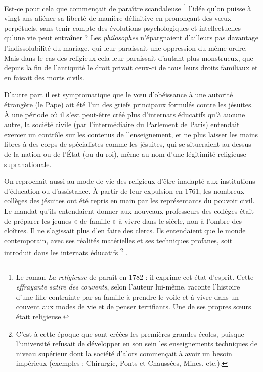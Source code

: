  Est-ce pour cela que commençait de paraître scandaleuse%
\footnote{Le roman \emph{La religieuse} de  paraît en 1782 : il exprime cet état d'esprit. Cette \emph{effrayante satire des couvents}, selon l'auteur lui-même, raconte l'histoire d'une fille contrainte par sa famille à prendre le voile et à vivre dans un couvent aux modes de vie et de penser terrifiants. Une de ses propres sœurs était religieuse.} 
l'idée qu'on puisse à vingt ans aliéner sa liberté de manière définitive en prononçant des vœux perpétuels, sans tenir compte des évolutions psychologiques et intellectuelles qu'une vie peut entraîner ? Les \emph{philosophes} n'épargnaient d'ailleurs pas davantage l'indissolubilité du mariage, qui leur paraissait une oppression du même ordre. Mais dans le cas des religieux cela leur paraissait d'autant plus monstrueux, que depuis la fin de l'antiquité le droit privait ceux-ci de tous leurs droits familiaux et en faisait des morts civils. 

 D'autre part il est symptomatique que le vœu d'obéissance à une autorité étrangère (le Pape) ait été l'un des griefs principaux formulés contre les jésuites. À une période où il s'est peut-être créé plus d'internats éducatifs qu'à aucune autre, la société civile (par l'intermédiaire du Parlement de Paris) entendait exercer un contrôle sur les contenus de l'enseignement, et ne plus laisser les mains libres à des corps de spécialistes comme les jésuites, qui se situeraient au-dessus de la nation ou de l'État (ou du roi), même au nom d'une légitimité religieuse supranationale.

 On reprochait aussi au mode de vie des religieux d'être inadapté aux institutions d'éducation ou d'assistance. À partir de leur expulsion en 1761, les nombreux collèges des jésuites ont été repris en main par les représentants du pouvoir civil. Le mandat qu'ils entendaient donner aux nouveaux professeurs des collèges était de préparer les jeunes « de famille » à vivre dans le siècle, non à l'ombre des cloîtres. Il ne s'agissait plus d'en faire des clercs. Ils entendaient que le monde contemporain, avec ses réalités matérielles et ses techniques profanes, soit introduit dans les internats éducatifs%
\footnote{C'est à cette époque que sont créées les premières grandes écoles, puisque l'université refusait de développer en son sein les enseignements techniques de niveau supérieur dont la société d'alors commençait à avoir un besoin impérieux (exemples : Chirurgie, Ponts et Chaussées, Mines, etc.).}%
.

